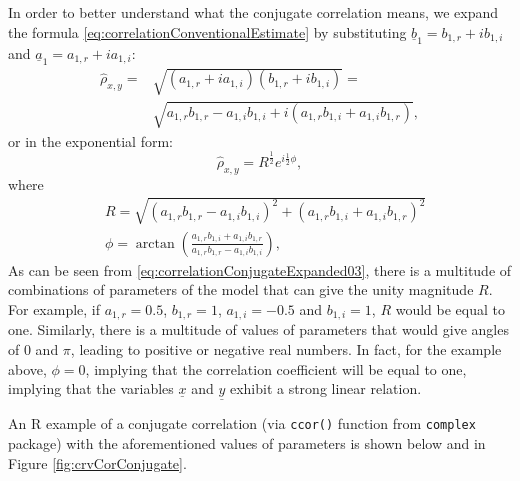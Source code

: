 \documentclass[
]{book}
\begin{document}
In order to better understand what the conjugate correlation means, we expand the formula \eqref{eq:correlationConventionalEstimate} by substituting \(\underline{b}_1 = b_{1,r} + i b_{1,i}\) and \(\underline{a}_1 = a_{1,r} + i a_{1,i}\):
\begin{equation}
    \begin{aligned}
        \hat{\rho}_{x,y} = & \sqrt{(a_{1,r} + i a_{1,i}) (b_{1,r}+ib_{1,i})} = \\
        & \sqrt{a_{1,r} b_{1,r} - a_{1,i} b_{1,i} + i(a_{1,r} b_{1,i} + a_{1,i} b_{1,r})},
    \end{aligned}
    \label{eq:correlationConjugateExpanded01}
\end{equation}
or in the exponential form:
\begin{equation}
    \hat{\rho}_{x,y} = R^{\frac{1}{2}} e^{i \frac{1}{2} \phi} ,
    \label{eq:correlationConjugateExpanded02}
\end{equation}
where
\begin{equation}
    \begin{aligned}
        & R = \sqrt{(a_{1,r} b_{1,r} - a_{1,i} b_{1,i})^2 + (a_{1,r} b_{1,i} + a_{1,i} b_{1,r})^2} \\
        & \phi=\arctan\left(\frac{a_{1,r} b_{1,i} + a_{1,i} b_{1,r}}{a_{1,r} b_{1,r} - a_{1,i} b_{1,i}}\right),
    \end{aligned}
    \label{eq:correlationConjugateExpanded03}
\end{equation}
As can be seen from \eqref{eq:correlationConjugateExpanded03}, there is a multitude of combinations of parameters of the model that can give the unity magnitude \(R\). For example, if \(a_{1,r} = 0.5\), \(b_{1,r} = 1\), \(a_{1,i} = -0.5\) and \(b_{1,i} = 1\), \(R\) would be equal to one. Similarly, there is a multitude of values of parameters that would give angles of \(0\) and \(\pi\), leading to positive or negative real numbers. In fact, for the example above, \(\phi=0\), implying that the correlation coefficient will be equal to one, implying that the variables \(\underline{x}\) and \(\underline{y}\) exhibit a strong linear relation.

An R example of a conjugate correlation (via \texttt{ccor()} function from \texttt{complex} package) with the aforementioned values of parameters is shown below and in Figure \ref{fig:crvCorConjugate}.
\end{document}
